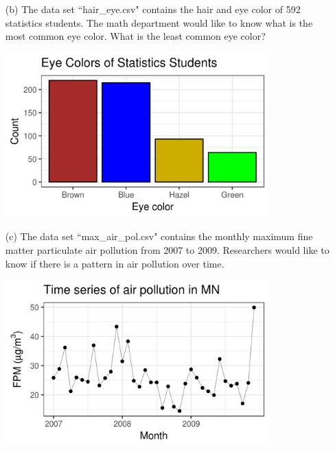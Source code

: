 \documentclass{article}
\begin{document}
\begin{flushleft}
\begin{itemize}
\bigskip
{}


\newpage


\item[(b)] The data set ``hair\_eye.csv" contains the hair and eye color of 592 statistics students. The math department would like to know what is the most common eye color. What is the least common eye color?\\
\bigskip
{}
\bigskip

{\centering
\includegraphics[width=4in]{images/grp02_Q3_b}
\par}

\bigskip
{}

\vspace{.25in}

\item[(c)] The data set ``max\_air\_pol.csv" contains the monthly maximum fine matter particulate air pollution from 2007 to 2009. Researchers would like to know if there is a pattern in air pollution over time.\\

\bigskip
{}
\bigskip

{\centering
\includegraphics[width=4in]{images/grp02_Q3_c}
\par}


\end{itemize}
\end{flushleft}
\end{document}
